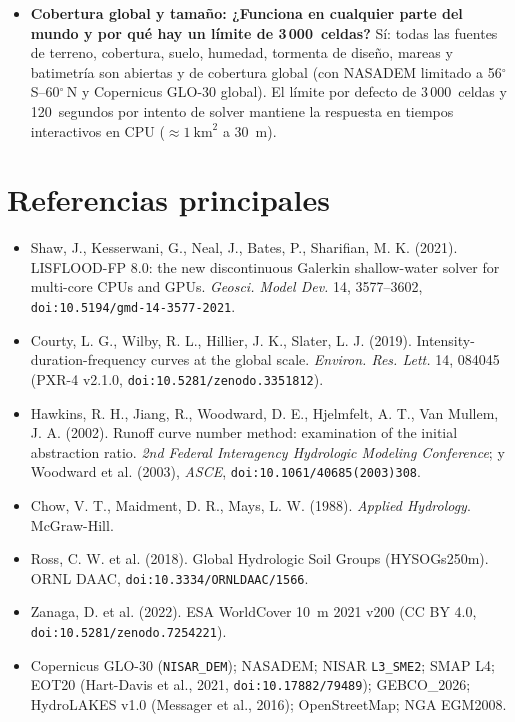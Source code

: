 \documentclass[11pt,letterpaper]{article}
\begin{document}
\begin{itemize}
  \item \textbf{Cobertura global y tamaño: ¿Funciona en cualquier parte del mundo y por qué hay un límite de 3\,000~celdas?}
  Sí: todas las fuentes de terreno, cobertura, suelo, humedad, tormenta de diseño, mareas y batimetría son abiertas y de cobertura global (con NASADEM limitado a 56$^\circ$\,S--60$^\circ$\,N y Copernicus GLO-30 global). El límite por defecto de 3\,000~celdas y 120~segundos por intento de solver mantiene la respuesta en tiempos interactivos en CPU ($\approx 1\ \text{km}^2$ a 30~m).
\end{itemize}

\section*{Referencias principales}
{\small
\begin{itemize}
  \item Shaw, J., Kesserwani, G., Neal, J., Bates, P., Sharifian, M. K. (2021). LISFLOOD-FP 8.0: the new discontinuous Galerkin shallow-water solver for multi-core CPUs and GPUs. \emph{Geosci. Model Dev.} 14, 3577--3602, \nolinkurl{doi:10.5194/gmd-14-3577-2021}.
  \item Courty, L. G., Wilby, R. L., Hillier, J. K., Slater, L. J. (2019). Intensity-duration-frequency curves at the global scale. \emph{Environ. Res. Lett.} 14, 084045 (PXR-4 v2.1.0, \nolinkurl{doi:10.5281/zenodo.3351812}).
  \item Hawkins, R. H., Jiang, R., Woodward, D. E., Hjelmfelt, A. T., Van Mullem, J. A. (2002). Runoff curve number method: examination of the initial abstraction ratio. \emph{2nd Federal Interagency Hydrologic Modeling Conference}; y Woodward et al. (2003), \emph{ASCE}, \nolinkurl{doi:10.1061/40685(2003)308}.
  \item Chow, V. T., Maidment, D. R., Mays, L. W. (1988). \emph{Applied Hydrology}. McGraw-Hill.
  \item Ross, C. W. et al. (2018). Global Hydrologic Soil Groups (HYSOGs250m). ORNL DAAC, \nolinkurl{doi:10.3334/ORNLDAAC/1566}.
  \item Zanaga, D. et al. (2022). ESA WorldCover 10~m 2021 v200 (CC BY 4.0, \nolinkurl{doi:10.5281/zenodo.7254221}).
  \item Copernicus GLO-30 (\texttt{NISAR\_DEM}); NASADEM; NISAR \texttt{L3\_SME2}; SMAP L4; EOT20 (Hart-Davis et al., 2021, \nolinkurl{doi:10.17882/79489}); GEBCO\_2026; HydroLAKES v1.0 (Messager et al., 2016); OpenStreetMap; NGA EGM2008.
\end{itemize}
}
\end{document}
